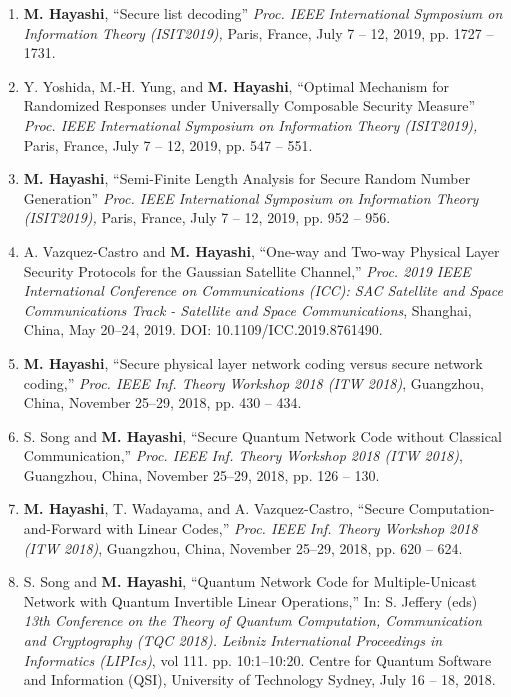 \documentclass[a4paper,12pt,oneside]{article}
\begin{document}
\begin{enumerate}
    \item
    \textbf{M. Hayashi}, 
    ``Secure list decoding'' 
    {\em Proc. IEEE International Symposium on Information Theory (ISIT2019),} 
    Paris, France, July 7 -- 12, 2019, pp. 1727 -- 1731. 
    
    \item
    Y. Yoshida, M.-H. Yung, and \textbf{M. Hayashi}, 
    ``Optimal Mechanism for Randomized Responses under Universally Composable Security Measure'' 
    {\em Proc. IEEE International Symposium on Information Theory (ISIT2019),} 
    Paris, France, July 7 -- 12, 2019, pp. 547 -- 551. 
    
    \item
    \textbf{M. Hayashi}, 
    ``Semi-Finite Length Analysis for Secure Random Number Generation'' 
    {\em Proc. IEEE International Symposium on Information Theory (ISIT2019),} 
    Paris, France, July 7 -- 12, 2019, pp. 952 -- 956. 
    
    \item
    A. Vazquez-Castro and \textbf{M. Hayashi}, 
    ``One-way and Two-way Physical Layer Security Protocols for the Gaussian Satellite Channel,'' 
    {\em Proc. 2019 IEEE International Conference on Communications (ICC): SAC Satellite and Space Communications Track - Satellite and Space Communications},
    Shanghai, China, May 20--24, 2019. DOI: 10.1109/ICC.2019.8761490.
    
    \item
    \textbf{M. Hayashi}, 
    ``Secure physical layer network coding versus secure network coding,''
    {\em Proc. IEEE Inf. Theory Workshop 2018 (ITW 2018)}, 
    Guangzhou, China, November 25--29, 2018, pp. 430 -- 434. 
    
    \item
    S. Song and \textbf{M. Hayashi}, 
    ``Secure Quantum Network Code without Classical Communication,''
    {\em Proc. IEEE Inf. Theory Workshop 2018 (ITW 2018)}, 
    Guangzhou, China, November 25--29, 2018, pp. 126 -- 130. 
    
    \item
    \textbf{M. Hayashi}, T. Wadayama, and A. Vazquez-Castro,
    ``Secure Computation-and-Forward with Linear Codes,''
    {\em Proc. IEEE Inf. Theory Workshop 2018 (ITW 2018)}, 
    Guangzhou, China, November 25--29, 2018, pp. 620 -- 624. 
    
    \item
    S. Song and \textbf{M. Hayashi}, 
    ``Quantum Network Code for Multiple-Unicast Network with Quantum Invertible Linear Operations,''
    In: S. Jeffery (eds) 
    {\em 13th Conference on the Theory of Quantum Computation, Communication and Cryptography (TQC 2018). Leibniz International Proceedings in Informatics (LIPIcs)},
     vol 111. pp. 10:1--10:20.
    Centre for Quantum Software and Information (QSI), University of Technology Sydney, 
    July 16 -- 18, 2018.
    

\end{enumerate}
\end{document}
